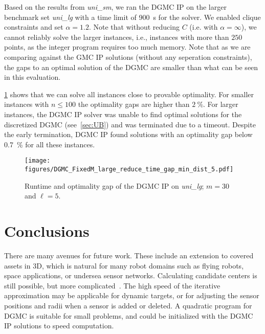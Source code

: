 \documentclass[letterpaper, 10 pt, conference]{ieeeconf}
\newcommand{\smallFixM}{\emph{uni\_sm}}
\newcommand{\largeFixM}{\emph{uni\_lg}}
\newcommand{\gmcip}{GMC IP}
\newcommand{\dgmcip}{DGMC IP}
\begin{document}
Based on the results from \smallFixM{}, we ran the \dgmcip{} on the larger benchmark set \largeFixM{} with a time limit of \SI{900}{\second} for the solver.
We enabled clique constraints and set $\alpha = 1.2$.
Note that without reducing $C$ (i.e. with $\alpha = \infty$), we cannot reliably solve the larger instances, i.e., instances with more than $250$ points, as the integer program requires too much memory. 
Note that as we are comparing against the \gmcip{} solutions (without any seperation constraints), the gaps to an optimal solution of the DGMC are smaller than what can be seen in this evaluation.

\cref{fig:dgmc_large} shows that we can solve all instances close to provable optimality.
For smaller instances with $n\leq 100$ the optimality gaps are higher than $\SI{2}{\percent}$.
For larger instances, the \dgmcip{} solver was unable to find optimal solutions for the discretized DGMC (see~\cref{sec:UB}) and was terminated due to a timeout. Despite the early termination, \dgmcip{} found solutions with an optimality gap below \SI{0.7}{\percent} for all these instances. 

\begin{figure}[htb]
    \centering
    \texttt{[image: figures/DGMC\_FixedM\_large\_reduce\_time\_gap\_min\_dist\_5.pdf]}
    \caption{\label{fig:dgmc_large}
    Runtime and optimality gap of the \dgmcip{} on \largeFixM{}; $m=30$ and $\ell=5$.}
\end{figure}


\section{Conclusions}

There are many avenues for future work.
These include an extension to covered assets in 3D, which is natural for many robot domains such as flying robots, space applications, or undersea sensor networks.
Calculating candidate centers is still possible, but more complicated~\cite{gartner1999fast}.
The high speed of the iterative approximation may be applicable for dynamic targets, or for adjusting the sensor positions and radii when a sensor is added or deleted.
A quadratic program for DGMC is suitable for small problems, and could be initialized with the \dgmcip{} solutions to speed computation.
\end{document}

